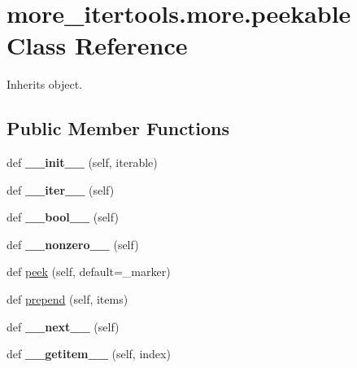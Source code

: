 \hypertarget{classmore__itertools_1_1more_1_1peekable}{}\section{more\+\_\+itertools.\+more.\+peekable Class Reference}
\label{classmore__itertools_1_1more_1_1peekable}


Inherits object.

\subsection*{Public Member Functions}
\begin{DoxyCompactItemize}
\item 
\mbox{\label{classmore__itertools_1_1more_1_1peekable_a3f8afe4490a22bedec388554f6599f52}} 
def {\bfseries \+\_\+\+\_\+init\+\_\+\+\_\+} (self, iterable)
\item 
\mbox{\label{classmore__itertools_1_1more_1_1peekable_a1e6eea029c95e9b1e354e5cf190e299d}} 
def {\bfseries \+\_\+\+\_\+iter\+\_\+\+\_\+} (self)
\item 
\mbox{\label{classmore__itertools_1_1more_1_1peekable_a60b9c0e76b8893906e081f91fee915a4}} 
def {\bfseries \+\_\+\+\_\+bool\+\_\+\+\_\+} (self)
\item 
\mbox{\label{classmore__itertools_1_1more_1_1peekable_ac55565a071fcdab67bf7a4f847ea38dc}} 
def {\bfseries \+\_\+\+\_\+nonzero\+\_\+\+\_\+} (self)
\item 
def \hyperlink{classmore__itertools_1_1more_1_1peekable_ad5d8e5b83e714b20e81f17225ebfcb83}{peek} (self, default=\+\_\+marker)
\item 
def \hyperlink{classmore__itertools_1_1more_1_1peekable_a0defedea516792e72241c3c8f97d99b2}{prepend} (self, items)
\item 
\mbox{\label{classmore__itertools_1_1more_1_1peekable_a962803265cc1f809d7d01dc896dcbcfe}} 
def {\bfseries \+\_\+\+\_\+next\+\_\+\+\_\+} (self)
\item 
\mbox{\label{classmore__itertools_1_1more_1_1peekable_aa5539de454582544c0b7b2aaa8d060be}} 
def {\bfseries \+\_\+\+\_\+getitem\+\_\+\+\_\+} (self, index)
\end{DoxyCompactItemize}
